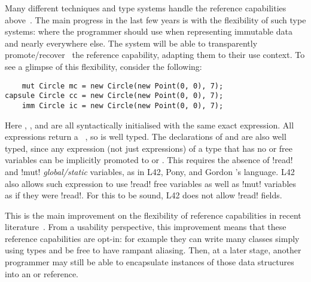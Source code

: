 \noindent Many different techniques and type systems handle the reference capabilities above~\cite{ZibinEtAl10,ClarkeWrigstad03,HallerOdersky10,GordonEtAl12,ServettoZucca15}.
The main progress in the last few years is with the flexibility of such type systems:
 where the programmer should use \Q@imm@ when  representing immutable data
and \Q@mut@ nearly everywhere else. The system will be able to transparently promote/recover~\cite{GordonEtAl12,clebsch2015deny,ServettoZucca15} the reference capability, adapting them to their use context.
To see a glimpse of this flexibility, consider the following:
\begin{lstlisting}
    mut Circle mc = new Circle(new Point(0, 0), 7);
capsule Circle cc = new Circle(new Point(0, 0), 7);
    imm Circle ic = new Circle(new Point(0, 0), 7);
\end{lstlisting}
Here \Q@mc@, \Q@cc@, and \Q@ic@ are all syntactically initialised with the same exact expression. All
\Q@new@ expressions return a \Q@mut@~\cite{clebsch2015deny,GIANNINI2019145}, so \Q@mc@ is well typed. The declarations of \Q@cc@ and \Q@ic@ are also well typed, since 
any expression (not just \Q@new@ expressions) 
of a \Q@mut@ type that has no \Q@mut@ or \Q@read@ free 
variables can be implicitly promoted to \Q@capsule@ or \Q@imm@.
This requires the absence of \Q!read! and \Q!mut! \emph{global/static} variables, as in L42, Pony, and Gordon \etal's language.
L42 also allows such expression to use \Q!read! free variables as well as \Q!mut! variables as if they were \Q!read!. For this to be sound, L42 does not allow \Q!read! fields.

This is the main improvement on the flexibility of reference capabilities in recent literature~\cite{ServettoEtAl13a,ServettoZucca15,GordonEtAl12,clebsch2015deny,clebsch2017orca}.
From a usability perspective, this improvement means that
these reference capabilities are opt-in:  for example they can write many classes
simply using \Q@mut@ types and be free to have rampant aliasing. 
Then, at a later stage, another programmer may still 
be able to encapsulate instances of those data structures into an \Q@imm@ or \Q@capsule@ reference.

